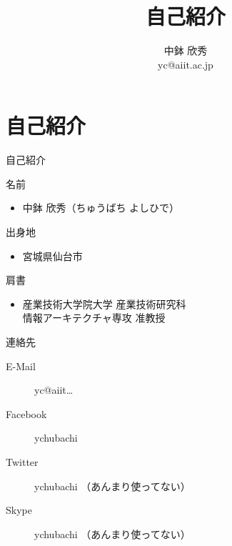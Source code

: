 \documentclass[t]{beamer}
\institute[AIIT]{産業技術大学院大学(AIIT)}
\author{中鉢 欣秀 \\ yc@aiit.ac.jp}
\date{}
\title{自己紹介}
\begin{document}
\maketitle

\section{自己紹介}
\label{sec-1}
\begin{frame}[label=sec-1-1]{自己紹介}
\begin{block}{名前}
\begin{itemize}
\item 中鉢 欣秀（ちゅうばち よしひで）
\end{itemize}
\end{block}

\begin{block}{出身地}
\begin{itemize}
\item 宮城県仙台市
\end{itemize}
\end{block}

\begin{block}{肩書}
\begin{itemize}
\item 産業技術大学院大学 産業技術研究科 \\ 情報アーキテクチャ専攻 准教授
\end{itemize}
\end{block}
\end{frame}

\begin{frame}[label=sec-1-2]{連絡先}
\begin{description}
\item[{E-Mail}] yc@aiit\ldots{}
\item[{Facebook}] ychubachi
\item[{Twitter}] ychubachi （あんまり使ってない）
\item[{Skype}] ychubachi （あんまり使ってない）
\end{description}
\end{frame}
\end{document}
